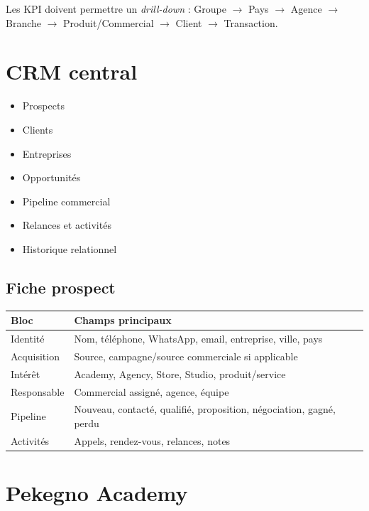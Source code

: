 \documentclass[11pt,a4paper]{article}
\newcommand{\tableheader}[2]{\textbf{#1} & \textbf{#2} \\ \hline}
\begin{document}
Les KPI doivent permettre un \emph{drill-down} :
Groupe $\rightarrow$ Pays $\rightarrow$ Agence $\rightarrow$ Branche $\rightarrow$ Produit/Commercial $\rightarrow$ Client $\rightarrow$ Transaction.

\section{CRM central}

\begin{itemize}
  \item Prospects
  \item Clients
  \item Entreprises
  \item Opportunités
  \item Pipeline commercial
  \item Relances et activités
  \item Historique relationnel
\end{itemize}

\subsection{Fiche prospect}

\begin{tabularx}{\textwidth}{|l|X|}
\hline
\tableheader{Bloc}{Champs principaux}
Identité & Nom, téléphone, WhatsApp, email, entreprise, ville, pays \\ \hline
Acquisition & Source, campagne/source commerciale si applicable \\ \hline
Intérêt & Academy, Agency, Store, Studio, produit/service \\ \hline
Responsable & Commercial assigné, agence, équipe \\ \hline
Pipeline & Nouveau, contacté, qualifié, proposition, négociation, gagné, perdu \\ \hline
Activités & Appels, rendez-vous, relances, notes \\ \hline
\end{tabularx}

\section{Pekegno Academy}
\end{document}
